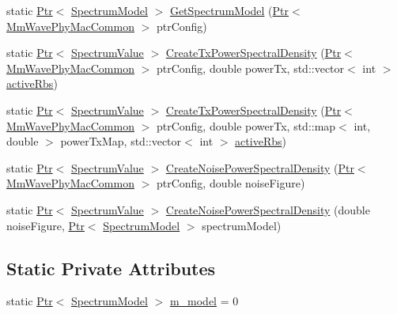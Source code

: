 \begin{DoxyCompactItemize}
\item 
static \hyperlink{classns3_1_1Ptr}{Ptr}$<$ \hyperlink{classns3_1_1SpectrumModel}{Spectrum\+Model} $>$ \hyperlink{classns3_1_1MmWaveSpectrumValueHelper_a23fc6693b28bb565a97768b536225b58}{Get\+Spectrum\+Model} (\hyperlink{classns3_1_1Ptr}{Ptr}$<$ \hyperlink{classns3_1_1MmWavePhyMacCommon}{Mm\+Wave\+Phy\+Mac\+Common} $>$ ptr\+Config)
\item 
static \hyperlink{classns3_1_1Ptr}{Ptr}$<$ \hyperlink{classns3_1_1SpectrumValue}{Spectrum\+Value} $>$ \hyperlink{classns3_1_1MmWaveSpectrumValueHelper_a1a968ae81d81f346027fe474e7962148}{Create\+Tx\+Power\+Spectral\+Density} (\hyperlink{classns3_1_1Ptr}{Ptr}$<$ \hyperlink{classns3_1_1MmWavePhyMacCommon}{Mm\+Wave\+Phy\+Mac\+Common} $>$ ptr\+Config, double power\+Tx, std\+::vector$<$ int $>$ \hyperlink{generate__test__data__lte__spectrum__value__txpsd_8m_a24a77723355dffcf07f2679649d46828}{active\+Rbs})
\item 
static \hyperlink{classns3_1_1Ptr}{Ptr}$<$ \hyperlink{classns3_1_1SpectrumValue}{Spectrum\+Value} $>$ \hyperlink{classns3_1_1MmWaveSpectrumValueHelper_a197369303e536cd592b7ac4aebbe7140}{Create\+Tx\+Power\+Spectral\+Density} (\hyperlink{classns3_1_1Ptr}{Ptr}$<$ \hyperlink{classns3_1_1MmWavePhyMacCommon}{Mm\+Wave\+Phy\+Mac\+Common} $>$ ptr\+Config, double power\+Tx, std\+::map$<$ int, double $>$ power\+Tx\+Map, std\+::vector$<$ int $>$ \hyperlink{generate__test__data__lte__spectrum__value__txpsd_8m_a24a77723355dffcf07f2679649d46828}{active\+Rbs})
\item 
static \hyperlink{classns3_1_1Ptr}{Ptr}$<$ \hyperlink{classns3_1_1SpectrumValue}{Spectrum\+Value} $>$ \hyperlink{classns3_1_1MmWaveSpectrumValueHelper_ae17f7f89a0ce6934b94886b463c6db44}{Create\+Noise\+Power\+Spectral\+Density} (\hyperlink{classns3_1_1Ptr}{Ptr}$<$ \hyperlink{classns3_1_1MmWavePhyMacCommon}{Mm\+Wave\+Phy\+Mac\+Common} $>$ ptr\+Config, double noise\+Figure)
\item 
static \hyperlink{classns3_1_1Ptr}{Ptr}$<$ \hyperlink{classns3_1_1SpectrumValue}{Spectrum\+Value} $>$ \hyperlink{classns3_1_1MmWaveSpectrumValueHelper_ac7fbcb2539490f77adbee2487580abb5}{Create\+Noise\+Power\+Spectral\+Density} (double noise\+Figure, \hyperlink{classns3_1_1Ptr}{Ptr}$<$ \hyperlink{classns3_1_1SpectrumModel}{Spectrum\+Model} $>$ spectrum\+Model)
\end{DoxyCompactItemize}
\subsection*{Static Private Attributes}
\begin{DoxyCompactItemize}
\item 
static \hyperlink{classns3_1_1Ptr}{Ptr}$<$ \hyperlink{classns3_1_1SpectrumModel}{Spectrum\+Model} $>$ \hyperlink{classns3_1_1MmWaveSpectrumValueHelper_acc22bc3ad1571c328d808ccaf2c56a09}{m\+\_\+model} = 0
\end{DoxyCompactItemize}


